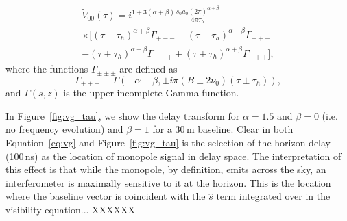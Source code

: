 \begin{multline}
\tilde{V}_{00}(\tau) = i^{1 + 3(\alpha+\beta)} \frac{s_0 a_0 (2\pi)^{\alpha+\beta}}{4\pi\tau_h} \\
\times \Big[(\tau-\tau_h)^{\alpha+\beta}\Gamma_{+--} - (\tau-\tau_h)^{\alpha+\beta}\Gamma_{-+-} \\
 - (\tau+\tau_h)^{\alpha+\beta}\Gamma_{+-+} + (\tau+\tau_h)^{\alpha+\beta}\Gamma_{-++}\Big], 
\label{eq:vg}
\end{multline}
where the functions $\Gamma_{\pm\pm\pm}$ are defined as
\begin{equation}
\Gamma_{\pm\pm\pm} \equiv \Gamma(-\alpha-\beta, \pm i \pi (B \pm 2\nu_0)(\tau \pm \tau_h)),
\end{equation}
and $\Gamma(s, z)$ is the upper incomplete Gamma function.

In Figure~\ref{fig:vg_tau}, we show the delay transform for $\alpha=1.5$ and $\beta=0$ (i.e. no frequency evolution) and $\beta=1$ for a 30\,m baseline. Clear in both Equation~\ref{eq:vg} and Figure~\ref{fig:vg_tau} is the selection of the horizon delay (100\,ns) as the location of monopole signal in delay space. The interpretation of this effect is that while the monopole, by definition, emits across the sky, an interferometer is maximally sensitive to it at the horizon. This is the location where the baseline vector is coincident with the $\hat{s}$ term integrated over in the visibility equation... XXXXXX

